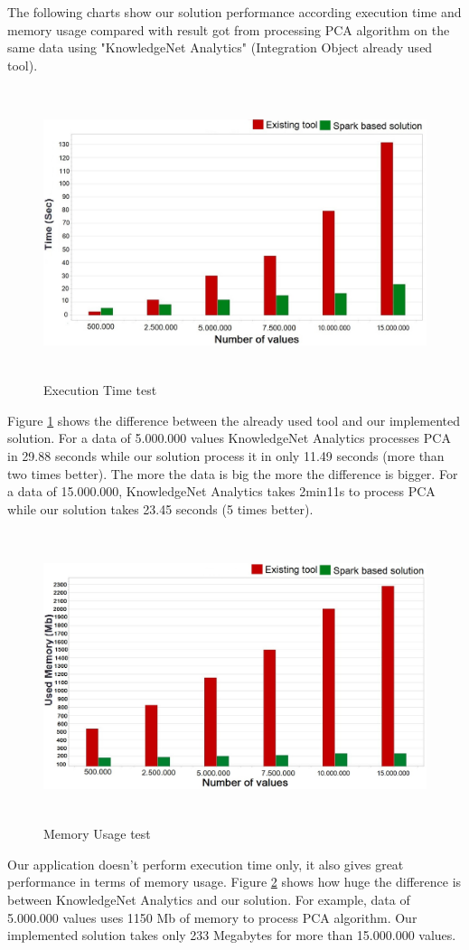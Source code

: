 The following charts show our solution performance according execution time and memory usage compared with result got from processing PCA algorithm on the same data using "KnowledgeNet Analytics" (Integration Object already used tool).
\begin{figure}[H]
\begin{center}
\includegraphics[width=15cm,height=8.5cm]{chapter5/1.JPG}
\end{center}
\caption{Execution Time test}
\label{teste1}
\end{figure}
Figure \ref{teste1} shows the difference between the already used tool and our implemented solution. For a data of 5.000.000 values KnowledgeNet Analytics processes PCA in 29.88 seconds while our solution process it in only 11.49 seconds (more than two times better). The more the data is big the more the difference is bigger. For a data of 15.000.000, KnowledgeNet Analytics takes 2min11s to process PCA while our solution takes 23.45 seconds (5 times better).
\begin{figure}[H]
\begin{center}
\includegraphics[width=15cm,height=8.5cm]{chapter5/2.JPG}
\end{center}
\caption{Memory Usage test}
\label{teste2}
\end{figure}
Our application doesn't perform execution time only, it also gives great performance in terms of memory usage. Figure \ref{teste2} shows how huge the difference is between KnowledgeNet Analytics and our solution.  For example, data of 5.000.000 values uses 1150 Mb of memory to process PCA algorithm. Our implemented solution takes only 233 Megabytes for more than 15.000.000 values.
